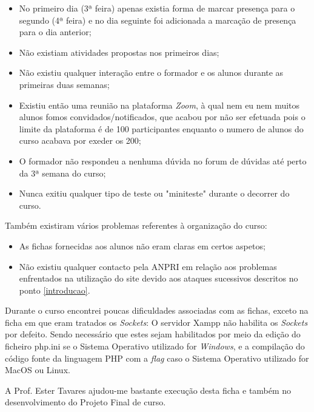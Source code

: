 \documentclass[14pt]{article}
\begin{document}
\begin{itemize}
  \item No primeiro dia (3ª feira) apenas existia forma de marcar presença para o segundo (4ª feira) e no dia seguinte foi adicionada a marcação de presença para o dia anterior;
  \item Não existiam atividades propostas nos primeiros dias;
  \item Não existiu qualquer interação entre o formador e os alunos durante as primeiras duas semanas;
  \item Existiu então uma reunião na plataforma \textit{Zoom}, à qual nem eu nem muitos alunos fomos convidados/notificados, que acabou por não ser efetuada pois o limite da plataforma é de 100 participantes enquanto o numero de alunos do curso acabava por exeder os 200;
  \item O formador não respondeu a nenhuma dúvida no forum de dúvidas até perto da 3ª semana do curso;
  \item Nunca exitiu qualquer tipo de teste ou "miniteste" durante o decorrer do curso.
\end{itemize}
\newline
Também existiram vários problemas referentes à organização do curso:
\begin{itemize}
  \item As fichas fornecidas aos alunos não eram claras em certos aspetos;
  \item Não existiu qualquer contacto pela ANPRI em relação aos problemas enfrentados na utilização do site devido aos ataques sucessivos descritos no ponto \large\ref{introducao}.
\end{itemize}
\newpage
Durante o curso encontrei poucas dificuldades associadas com as fichas, exceto na ficha em que eram tratados os \textit{Sockets}:
O servidor Xampp não habilita os \textit{Sockets} por defeito. Sendo necessário que estes sejam habilitados por meio da edição do ficheiro php.ini se o Sistema Operativo utilizado for \textit{Windows}, e a compilação do código fonte da linguagem PHP com a \textit{flag}  caso o Sistema Operativo utilizado for MacOS ou Linux.

A Prof. Ester Tavares ajudou-me bastante execução desta ficha e também no desenvolvimento do Projeto Final de curso.
\end{document}
